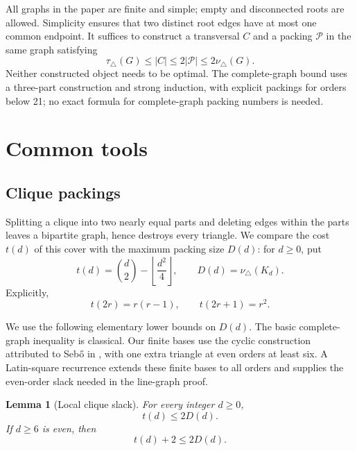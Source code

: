 \documentclass[11pt]{article}
\newtheorem{lemma}[theorem]{Lemma}
\theoremstyle{remark}
\newcommand{\tri}{\triangle}
\begin{document}
All graphs in the paper are finite and simple; empty and disconnected roots
are allowed.  Simplicity ensures that two distinct root edges have at most
one common endpoint.  It suffices to construct a transversal $C$ and a
packing $\mathcal P$ in the same graph satisfying
\[
  \tau_\tri(G)\leq |C|\leq 2|\mathcal P|\leq 2\nu_\tri(G).
\]
Neither constructed object needs to be optimal.
The complete-graph bound uses a three-part construction and strong induction,
with explicit packings for orders below 21; no exact formula for
complete-graph packing numbers is needed.

\section{Common tools}\label{sec:tools}

\subsection{Clique packings}\label{sec:clique}

Splitting a clique into two nearly equal parts and deleting edges within
the parts leaves a bipartite graph, hence destroys every triangle.  We
compare the cost $t(d)$ of this cover with the maximum packing size $D(d)$:
for $d\geq0$, put
\[
  t(d)=\binom d2-\left\lfloor\frac{d^2}{4}\right\rfloor,
  \qquad D(d)=\nu_\tri(K_d).
\]
Explicitly,
\begin{equation}\label{eq:t-values}
  t(2r)=r(r-1),\qquad t(2r+1)=r^2.
\end{equation}

We use the following elementary lower bounds on $D(d)$.  The basic
complete-graph inequality is classical.  Our finite bases use the cyclic
construction attributed to Seb\H{o} in
\cite[Theorem~3.3.2]{munaro2016}, with one extra triangle at even orders
at least six.  A Latin-square recurrence extends these finite bases to all
orders and supplies the even-order slack needed in the line-graph proof.

\begin{lemma}[Local clique slack]\label{lem:clique}
For every integer $d\geq 0$,
\begin{equation}\label{eq:basic-slack}
  t(d)\leq 2D(d).
\end{equation}
If $d\geq 6$ is even, then
\begin{equation}\label{eq:even-slack}
  t(d)+2\leq 2D(d).
\end{equation}
\end{lemma}
\end{document}
